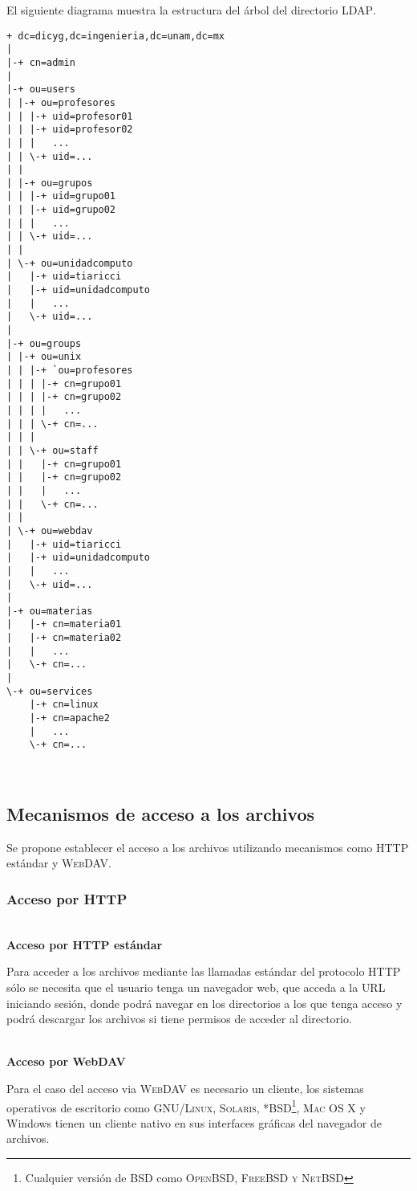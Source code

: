 El siguiente diagrama muestra la estructura del \'{a}rbol del directorio \textsc{LDAP}.

{
\scriptsize
\linespread{1}
\begin{verbatim}
+ dc=dicyg,dc=ingenieria,dc=unam,dc=mx
|
|-+ cn=admin
|
|-+ ou=users
| |-+ ou=profesores
| | |-+ uid=profesor01
| | |-+ uid=profesor02
| | |   ...
| | \-+ uid=...
| |
| |-+ ou=grupos
| | |-+ uid=grupo01
| | |-+ uid=grupo02
| | |   ...
| | \-+ uid=...
| |
| \-+ ou=unidadcomputo
|   |-+ uid=tiaricci
|   |-+ uid=unidadcomputo
|   |   ...  
|   \-+ uid=...
|  
|-+ ou=groups
| |-+ ou=unix
| | |-+ `ou=profesores
| | | |-+ cn=grupo01
| | | |-+ cn=grupo02
| | | |   ...
| | | \-+ cn=...
| | |
| | \-+ ou=staff
| |   |-+ cn=grupo01
| |   |-+ cn=grupo02
| |   |   ...
| |   \-+ cn=...
| |  
| \-+ ou=webdav
|   |-+ uid=tiaricci
|   |-+ uid=unidadcomputo
|   |   ...  
|   \-+ uid=...
|
|-+ ou=materias
|   |-+ cn=materia01
|   |-+ cn=materia02
|   |   ...
|   \-+ cn=...
|
\-+ ou=services
    |-+ cn=linux
    |-+ cn=apache2
    |   ...
    \-+ cn=...
\end{verbatim}
}
\

      \subsection {Mecanismos de acceso a los archivos}

Se propone establecer el acceso a los archivos utilizando mecanismos como \textsc{HTTP} est\'{a}ndar y \textsc{WebDAV}.

        \subsubsection {Acceso por HTTP}

          \textbf{\\ Acceso por HTTP est\'{a}ndar \\}

Para acceder a los archivos mediante las llamadas est\'{a}ndar del protocolo HTTP s\'{o}lo se necesita que el usuario tenga un navegador web, que acceda a la \textsc{URL} iniciando sesi\'{o}n, donde podr\'{a} navegar en los directorios a los que tenga acceso y podr\'{a} descargar los archivos si tiene permisos de acceder al directorio.

          \textbf{\\ Acceso por WebDAV \\}

Para el caso del acceso via \textsc{WebDAV} es necesario un cliente, los sistemas operativos de escritorio como \textsc{GNU/Linux}, \textsc{Solaris}, \textsc{*BSD\footnote{Cualquier versi\'{o}n de BSD como \textsc{OpenBSD, FreeBSD y NetBSD}}}, \textsc{Mac OS X} y Windows tienen un cliente nativo en sus interfaces gr\'{a}ficas del navegador de archivos.

